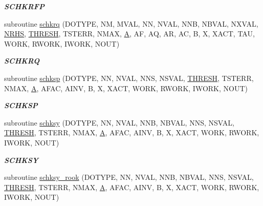\begin{DoxyCompactItemize}
\begin{DoxyCompactList}\small\item\em {\bfseries S\+C\+H\+K\+R\+F\+P} \end{DoxyCompactList}\item 
subroutine \hyperlink{group__single__lin_gad989d51da336db7d79642f962a3378e3}{schkrq} (D\+O\+T\+Y\+P\+E, N\+M, M\+V\+A\+L, N\+N, N\+V\+A\+L, N\+N\+B, N\+B\+V\+A\+L, N\+X\+V\+A\+L, \hyperlink{example__user_8c_aa0138da002ce2a90360df2f521eb3198}{N\+R\+H\+S}, \hyperlink{zlaqgs_8c_a0656018abfc9fa2821827415f5d5ea57}{T\+H\+R\+E\+S\+H}, T\+S\+T\+E\+R\+R, N\+M\+A\+X, \hyperlink{classA}{A}, A\+F, A\+Q, A\+R, A\+C, B, X, X\+A\+C\+T, T\+A\+U, W\+O\+R\+K, R\+W\+O\+R\+K, I\+W\+O\+R\+K, N\+O\+U\+T)
\begin{DoxyCompactList}\small\item\em {\bfseries S\+C\+H\+K\+R\+Q} \end{DoxyCompactList}\item 
subroutine \hyperlink{group__single__lin_ga6abf3836992df4859a1dbe721d806baf}{schksp} (D\+O\+T\+Y\+P\+E, N\+N, N\+V\+A\+L, N\+N\+S, N\+S\+V\+A\+L, \hyperlink{zlaqgs_8c_a0656018abfc9fa2821827415f5d5ea57}{T\+H\+R\+E\+S\+H}, T\+S\+T\+E\+R\+R, N\+M\+A\+X, \hyperlink{classA}{A}, A\+F\+A\+C, A\+I\+N\+V, B, X, X\+A\+C\+T, W\+O\+R\+K, R\+W\+O\+R\+K, I\+W\+O\+R\+K, N\+O\+U\+T)
\begin{DoxyCompactList}\small\item\em {\bfseries S\+C\+H\+K\+S\+P} \end{DoxyCompactList}\item 
subroutine \hyperlink{group__single__lin_ga1db2c844b27b9020eeac72df69274da1}{schksy} (D\+O\+T\+Y\+P\+E, N\+N, N\+V\+A\+L, N\+N\+B, N\+B\+V\+A\+L, N\+N\+S, N\+S\+V\+A\+L, \hyperlink{zlaqgs_8c_a0656018abfc9fa2821827415f5d5ea57}{T\+H\+R\+E\+S\+H}, T\+S\+T\+E\+R\+R, N\+M\+A\+X, \hyperlink{classA}{A}, A\+F\+A\+C, A\+I\+N\+V, B, X, X\+A\+C\+T, W\+O\+R\+K, R\+W\+O\+R\+K, I\+W\+O\+R\+K, N\+O\+U\+T)
\begin{DoxyCompactList}\small\item\em {\bfseries S\+C\+H\+K\+S\+Y} \end{DoxyCompactList}\item 
subroutine \hyperlink{group__single__lin_gae6b6eb724077b38b7c618fcbd7cfbf23}{schksy\+\_\+rook} (D\+O\+T\+Y\+P\+E, N\+N, N\+V\+A\+L, N\+N\+B, N\+B\+V\+A\+L, N\+N\+S, N\+S\+V\+A\+L, \hyperlink{zlaqgs_8c_a0656018abfc9fa2821827415f5d5ea57}{T\+H\+R\+E\+S\+H}, T\+S\+T\+E\+R\+R, N\+M\+A\+X, \hyperlink{classA}{A}, A\+F\+A\+C, A\+I\+N\+V, B, X, X\+A\+C\+T, W\+O\+R\+K, R\+W\+O\+R\+K, I\+W\+O\+R\+K, N\+O\+U\+T)

\end{DoxyCompactItemize}
